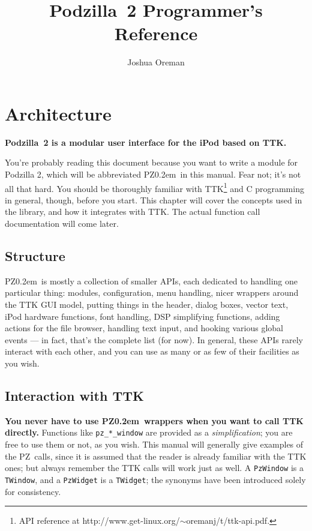 \documentclass[12pt,letterpaper]{report}
\title{Podzilla~2 Programmer's Reference}
\author{Joshua Oreman}
\def\pz{{\footnotesize PZ}}
\def\pzt{\pz\kern0.2em{\large\oldstyle2}}
\begin{document}
\maketitle
\tableofcontents

\chapter{Architecture}
{\bf Podzilla~2 is a modular user interface for the iPod based on TTK.}

\noindent You're probably reading this document because you want to write a module
for Podzilla 2, which will be abbreviated \pzt\ in this manual. Fear not; it's not all that
hard. You should be thoroughly familiar with
TTK\footnote{API reference at http://www.get-linux.org/$\sim$oremanj/t/ttk-api.pdf.} and C
programming in general, though, before you start. This chapter will cover the concepts used
in the library, and how it integrates with TTK. The actual function call documentation will
come later.

\section{Structure}
\pzt\ is mostly a collection of smaller APIs, each dedicated to handling one particular thing:
modules, configuration, menu handling, nicer wrappers around the TTK GUI model, putting things
in the header, dialog boxes, vector text, iPod hardware functions, font handling, DSP simplifying
functions, adding actions for the file browser, handling text input, and hooking various global
events --- in fact, that's the complete list (for now). In general, these APIs rarely interact
with each other, and you can use as many or as few of their facilities as you wish.

\section{Interaction with TTK}
{\bf You never have to use \pzt\ wrappers when you want to call TTK directly.} Functions like
\verb|pz_*_window| are provided as a {\it simplification}; you are free to use them or not,
as you wish. This manual will generally give examples of the \pz\ calls, since it is assumed
that the reader is already familiar with the TTK ones; but always remember the TTK calls will
work just as well. A \verb|PzWindow| is a \verb|TWindow|, and a \verb|PzWidget| is a \verb|TWidget|;
the synonyms have been introduced solely for consistency.
\end{document}
